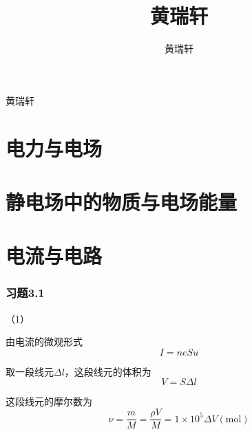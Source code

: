 \documentclass{SCIS2020cn}
\begin{document}
\DOI{}
\ReceiveDate{}
\ReviseDate{}
\AcceptDate{}
\OnlineDate{}

\title{黄瑞轩}{黄瑞轩}


\author[]{黄瑞轩}{}


\address[1]{ }



\AuthorCitation{ }
\enAuthorCitation{ }


\maketitle
\newpage

\part{电力与电场}
\part{静电场中的物质与电场能量}
\newpage
\part{电流与电路}
\section{习题3.1}
（1）

由电流的微观形式
\begin{equation}
    I=neSu
\end{equation}

取一段线元$\Delta{}l$，这段线元的体积为
\begin{equation}
    V=S\Delta{}l
\end{equation}

这段线元的摩尔数为
\begin{equation}
    \nu=\frac{m}{M}=\frac{\rho{}V}{M}=1×10^{5}\Delta{}V(\text{mol})
\end{equation}
\end{document}
